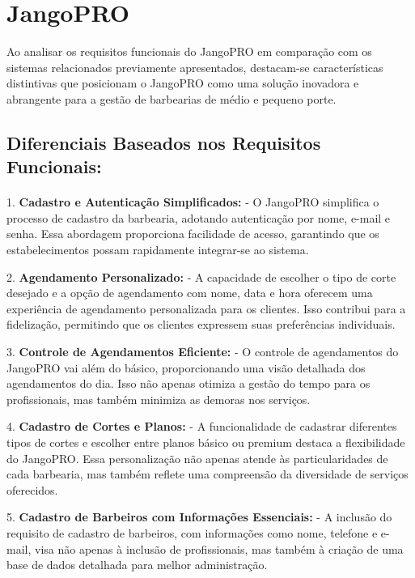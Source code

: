 \documentclass[12pt]{article}
\begin{document}
\section{JangoPRO}

Ao analisar os requisitos funcionais do JangoPRO em comparação com os sistemas relacionados previamente apresentados, destacam-se características distintivas que posicionam o JangoPRO como uma solução inovadora e abrangente para a gestão de barbearias de médio e pequeno porte.

\subsection{Diferenciais Baseados nos Requisitos Funcionais:}

\paragraph{} 1. \textbf{Cadastro e Autenticação Simplificados:}
   - O JangoPRO simplifica o processo de cadastro da barbearia, adotando autenticação por nome, e-mail e senha. Essa abordagem proporciona facilidade de acesso, garantindo que os estabelecimentos possam rapidamente integrar-se ao sistema.

2. \textbf{Agendamento Personalizado:}
   - A capacidade de escolher o tipo de corte desejado e a opção de agendamento com nome, data e hora oferecem uma experiência de agendamento personalizada para os clientes. Isso contribui para a fidelização, permitindo que os clientes expressem suas preferências individuais.

3. \textbf{Controle de Agendamentos Eficiente:}
   - O controle de agendamentos do JangoPRO vai além do básico, proporcionando uma visão detalhada dos agendamentos do dia. Isso não apenas otimiza a gestão do tempo para os profissionais, mas também minimiza as demoras nos serviços.

4. \textbf{Cadastro de Cortes e Planos:}
   - A funcionalidade de cadastrar diferentes tipos de cortes e escolher entre planos básico ou premium destaca a flexibilidade do JangoPRO. Essa personalização não apenas atende às particularidades de cada barbearia, mas também reflete uma compreensão da diversidade de serviços oferecidos.

5. \textbf{Cadastro de Barbeiros com Informações Essenciais:}
   - A inclusão do requisito de cadastro de barbeiros, com informações como nome, telefone e e-mail, visa não apenas à inclusão de profissionais, mas também à criação de uma base de dados detalhada para melhor administração.
\end{document}
